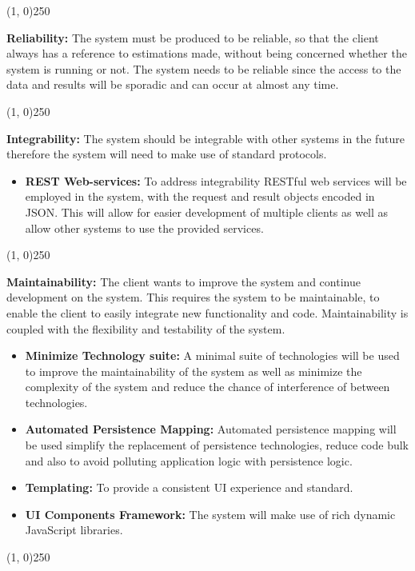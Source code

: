 		\begin{center}
		\line(1, 0){250}
		\end{center}
	{\bfseries Reliability:}
	The system must be produced to be reliable, so that the client always has a reference to estimations made, without being concerned whether the system is running or not. The system needs to be reliable since the access to the data and results will be sporadic and can occur at almost any time.
	\begin{center}
	\line(1, 0){250}
	\end{center}
	{\bfseries Integrability:}
	The system should be integrable with other systems in the future therefore the system will need to make use of standard protocols.
		\begin{itemize}
			\item{\bfseries REST Web-services:}
				To address integrability RESTful web services will be employed in the system, with the request and result objects encoded in JSON. This will allow for easier development of multiple clients as well as allow other systems to use the provided services.
		\end{itemize}
		\begin{center}
		\line(1, 0){250}
		\end{center}
	{\bfseries Maintainability:}
	The client wants to improve the system and continue development on the system. This requires the system to be maintainable, to enable the client to easily integrate new functionality and code. Maintainability is coupled with the flexibility and testability of the system.
		\begin{itemize}
			\item{\bfseries Minimize Technology suite:}
				A minimal suite of technologies will be used to improve the maintainability of the system as well as minimize the complexity of the system and reduce the chance of interference of between technologies.
			\item{\bfseries Automated Persistence Mapping:}
				Automated persistence mapping will be used simplify the replacement of persistence technologies, reduce code bulk and also to avoid polluting application logic with persistence logic.
			\item{\bfseries Templating:}
				To provide a consistent UI experience and standard.
			\item{\bfseries UI Components Framework:}
				The system will make use of rich dynamic JavaScript libraries.
		\end{itemize}
		\begin{center}
		\line(1, 0){250}
		\end{center}
